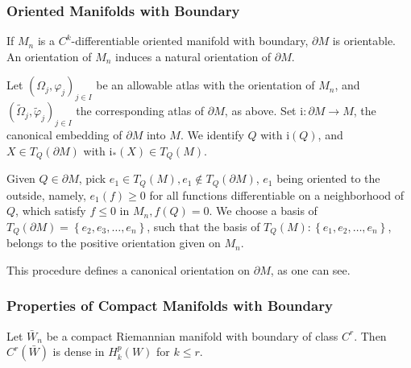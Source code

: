\documentclass[12pt,hyperref,a4paper,UTF8]{ctexart}
\begin{document}
\subsubsection{Oriented Manifolds with Boundary}
\begin{Theorem}
If $M_n$ is a $C^k$-differentiable oriented manifold with boundary, $\partial M$ is orientable. An orientation of $M_n$ induces a natural orientation of $\partial M$.
\label{thm52}
\end{Theorem}

\begin{Proof}
    Let $\left(\Omega_j, \varphi_j\right)_{j \in I}$ be an allowable atlas with the orientation of $M_n$, and $\left(\widetilde{\Omega}_j, \tilde{\varphi}_j\right)_{j \in I}$ the corresponding atlas of $\partial M$, as above. Set $\mathrm{i}: \partial M \rightarrow M$, the canonical embedding of $\partial M$ into $M$. We identify $Q$ with $\mathrm{i}(Q)$, and $X \in T_Q(\partial M)$ with $\mathrm{i}_*(X) \in T_Q(M)$. 
    
    \vskip 3pt
    Given $Q \in \partial M$, pick $e_1 \in T_Q(M), e_1 \notin T_Q(\partial M)$, $e_1$ being oriented to the outside, namely, $e_1(f) \geq 0$ for all functions differentiable on a neighborhood of $Q$, which satisfy $f \leq 0$ in $M_n, f(Q)=0$. We choose a basis of $T_Q(\partial M)=\left\{e_2, e_3, \ldots, e_n\right\}$, such that the basis of $T_Q(M):\left\{e_1, e_2, \ldots, e_n\right\}$, belongs to the positive orientation given on $M_n$.
\end{Proof}

\vskip 3pt
This procedure defines a canonical orientation on $\partial M$, as one can see.

\subsubsection{Properties of Compact Manifolds with Boundary}

\begin{Theorem}
Let $\bar{W}_n$ be a compact Riemannian manifold with boundary of class $C^r$. Then $C^r(\bar{W})$ is dense in $H_k^p(W)$ for $k \leq r$.
\label{thm53}
\end{Theorem}
\end{document}
